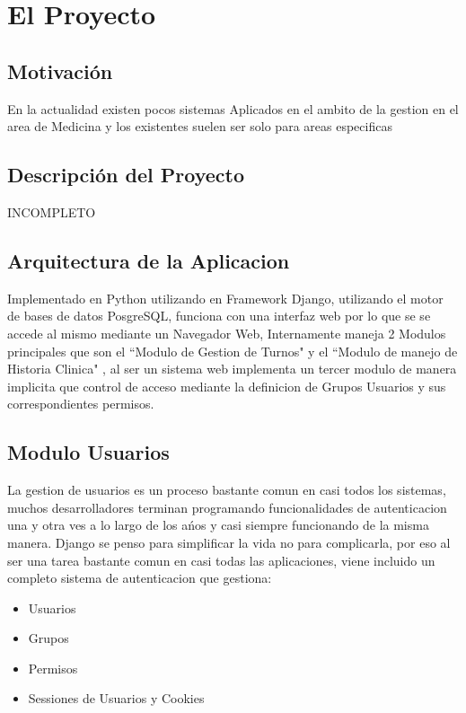 \chapter{El Proyecto}

\section{Motivación}

En la actualidad existen pocos sistemas Aplicados en el ambito de la gestion en
el area de Medicina y los existentes suelen ser solo para areas especificas

\section{Descripci\'on del Proyecto}

INCOMPLETO



\section{Arquitectura de la Aplicacion}

Implementado en Python utilizando en Framework Django, utilizando el motor de bases
de datos PosgreSQL, funciona con una interfaz web por lo que se se accede al
mismo mediante un Navegador Web, Internamente maneja 2 Modulos principales
que son el  ``Modulo de Gestion de Turnos" y el ``Modulo de manejo de
Historia Clinica" , al ser un sistema web implementa un tercer modulo de manera
implicita que control de acceso mediante la definicion de Grupos Usuarios y
sus correspondientes permisos.

\section{Modulo Usuarios}

La gestion de usuarios es un proceso bastante comun en casi todos los sistemas,
muchos desarrolladores terminan programando funcionalidades de autenticacion 
una y otra ves a lo largo de los a\'nos y casi siempre funcionando de la misma 
manera. Django se penso para simplificar la vida no para complicarla, por eso
al ser una tarea bastante comun en casi todas las aplicaciones, viene incluido
un completo sistema de autenticacion que gestiona:

\begin{itemize}
    \item Usuarios
    \item Grupos
    \item Permisos
    \item Sessiones de Usuarios y Cookies
\end{itemize}


